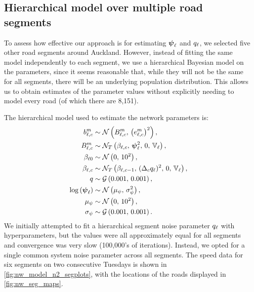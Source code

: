 \subsection{Hierarchical model over multiple road segments}
\label{sec:nw_par_est_multiple}



To assess how effective our approach is for estimating $\mathbf{\boldsymbol{\psi}}_\ell$ and $q_\ell$, we selected five other road segments around Auckland. However, instead of fitting the same model independently to each segment,  we use a hierarchical Bayesian model on the parameters, since it seems reasonable that, while they will not be the same for all segments, there will be an underlying population distribution. This allows us to obtain estimates of the parameter values without explicitly needing to model every road (of which there are 8,151).


The hierarchical model used to estimate the network parameters is:
\begin{equation}
\label{eq:tt_hist_hier}
\begin{split}
b_{\ell,c}^m &\sim \mathcal{N}\left(B_{\ell,c}^m,\, \left(e_{\ell,c}^m\right)^2\right), \\
B_{\ell,c}^m &\sim \mathcal{N}_T\left(\beta_{\ell,c},\, \mathbf{\boldsymbol{\psi}}_{\ell}^2,\, 0,\, \mathbb{V}_\ell\right), \\
\beta_{\ell0} &\sim \mathcal{N}\left(0,\, 10^2\right), \\
\beta_{\ell,c} &\sim \mathcal{N}_T\left(\beta_{\ell,c-1},\, (\Delta_c q_{\ell})^2,\, 0,\, \mathbb{V}_\ell\right), \\
q &\sim \mathcal{G}\left(0.001,\, 0.001\right), \\
\log\left(\mathbf{\boldsymbol{\psi}}_{\ell}\right) &\sim \mathcal{N}\left(\mu_\psi,\, \sigma_\psi^2\right), \\
\mu_\psi &\sim \mathcal{N}\left(0,\, 10^2\right), \\
\sigma_\psi &\sim \mathcal{G}\left(0.001,\, 0.001\right).
\end{split}
\end{equation}
We initially attempted to fit a hierarchical segment noise parameter $q_{\ell}$ with hyper\-parameters, but the values were all approximately equal for all segments and convergence was very slow (100,000's of iterations). Instead, we opted for a single common system noise parameter across all segments. The speed data for six segments on two consecutive Tuesdays is shown in \cref{fig:nw_model_n2_segplots}, with the locations of the roads displayed in \cref{fig:nw_seg_maps}.

